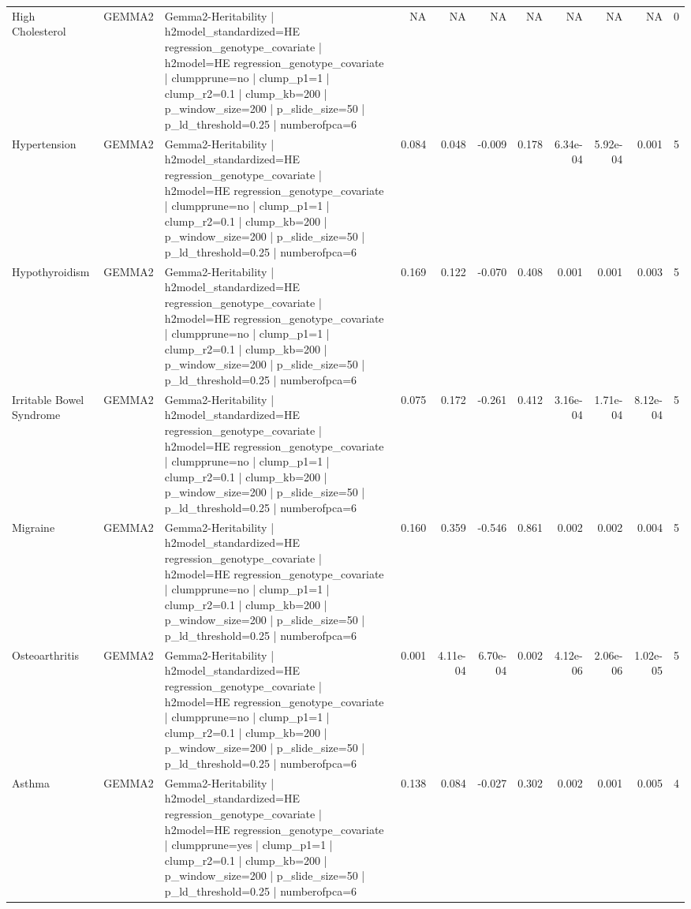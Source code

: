 \begin{landscape}
\begin{longtable}{p{2.4cm}p{1.8cm}p{6.0cm}rrrrrrrr}
High Cholesterol & GEMMA2 & Gemma2-Heritability | h2model\_standardized=HE regression\_genotype\_covariate | h2model=HE regression\_genotype\_covariate | clumpprune=no | clump\_p1=1 | clump\_r2=0.1 | clump\_kb=200 | p\_window\_size=200 | p\_slide\_size=50 | p\_ld\_threshold=0.25 | numberofpca=6 & NA & NA & NA & NA & NA & NA & NA & 0 \\
Hypertension & GEMMA2 & Gemma2-Heritability | h2model\_standardized=HE regression\_genotype\_covariate | h2model=HE regression\_genotype\_covariate | clumpprune=no | clump\_p1=1 | clump\_r2=0.1 | clump\_kb=200 | p\_window\_size=200 | p\_slide\_size=50 | p\_ld\_threshold=0.25 | numberofpca=6 & 0.084 & 0.048 & -0.009 & 0.178 & 6.34e-04 & 5.92e-04 & 0.001 & 5 \\
Hypothyroidism & GEMMA2 & Gemma2-Heritability | h2model\_standardized=HE regression\_genotype\_covariate | h2model=HE regression\_genotype\_covariate | clumpprune=no | clump\_p1=1 | clump\_r2=0.1 | clump\_kb=200 | p\_window\_size=200 | p\_slide\_size=50 | p\_ld\_threshold=0.25 | numberofpca=6 & 0.169 & 0.122 & -0.070 & 0.408 & 0.001 & 0.001 & 0.003 & 5 \\
Irritable Bowel Syndrome & GEMMA2 & Gemma2-Heritability | h2model\_standardized=HE regression\_genotype\_covariate | h2model=HE regression\_genotype\_covariate | clumpprune=no | clump\_p1=1 | clump\_r2=0.1 | clump\_kb=200 | p\_window\_size=200 | p\_slide\_size=50 | p\_ld\_threshold=0.25 | numberofpca=6 & 0.075 & 0.172 & -0.261 & 0.412 & 3.16e-04 & 1.71e-04 & 8.12e-04 & 5 \\
Migraine & GEMMA2 & Gemma2-Heritability | h2model\_standardized=HE regression\_genotype\_covariate | h2model=HE regression\_genotype\_covariate | clumpprune=no | clump\_p1=1 | clump\_r2=0.1 | clump\_kb=200 | p\_window\_size=200 | p\_slide\_size=50 | p\_ld\_threshold=0.25 | numberofpca=6 & 0.160 & 0.359 & -0.546 & 0.861 & 0.002 & 0.002 & 0.004 & 5 \\
Osteoarthritis & GEMMA2 & Gemma2-Heritability | h2model\_standardized=HE regression\_genotype\_covariate | h2model=HE regression\_genotype\_covariate | clumpprune=no | clump\_p1=1 | clump\_r2=0.1 | clump\_kb=200 | p\_window\_size=200 | p\_slide\_size=50 | p\_ld\_threshold=0.25 | numberofpca=6 & 0.001 & 4.11e-04 & 6.70e-04 & 0.002 & 4.12e-06 & 2.06e-06 & 1.02e-05 & 5 \\
Asthma & GEMMA2 & Gemma2-Heritability | h2model\_standardized=HE regression\_genotype\_covariate | h2model=HE regression\_genotype\_covariate | clumpprune=yes | clump\_p1=1 | clump\_r2=0.1 | clump\_kb=200 | p\_window\_size=200 | p\_slide\_size=50 | p\_ld\_threshold=0.25 | numberofpca=6 & 0.138 & 0.084 & -0.027 & 0.302 & 0.002 & 0.001 & 0.005 & 4 \\

\end{longtable}
\end{landscape}
